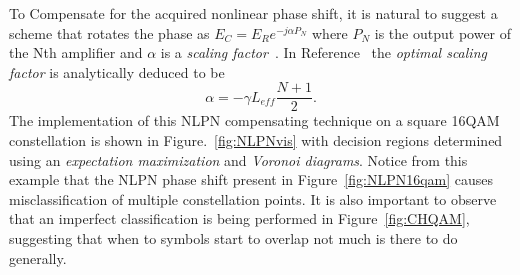 To Compensate for the acquired nonlinear phase shift, it is natural to suggest a scheme that rotates the phase as $E_{C}=E_{R}e^{-j\alpha P_{N}}$ where  $P_{N}$ is the output power of the Nth amplifier and $\alpha$ is a \textit{scaling factor}~\cite{liu2002improving}. In Reference~\cite{NLPNDSP} the \textit{optimal scaling factor} is analytically deduced to be 
\begin{equation}
\alpha=-\gamma L_{eff}\frac{N+1}{2}.
\end{equation}
 The implementation of this NLPN compensating technique on a square 16QAM constellation is shown in Figure.~\ref{fig:NLPNvis} with decision regions determined using an \textit{expectation maximization} and \textit{Voronoi diagrams}. Notice from this example that the NLPN phase shift present in Figure~\ref{fig:NLPN16qam} causes misclassification of multiple constellation points. It is also important to observe that an imperfect classification is being performed in Figure~\ref{fig:CHQAM}, suggesting that when to symbols start to overlap not much is there to do generally. ~\\


